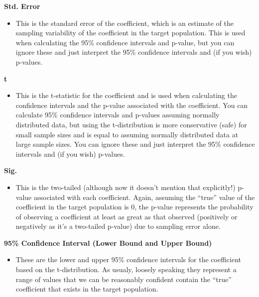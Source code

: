 \documentclass[
]{book}
\providecommand{\tightlist}{%
  \setlength{\itemsep}{0pt}\setlength{\parskip}{0pt}}
\begin{document}
\textbf{Std. Error}

\begin{itemize}
\tightlist
\item
  This is the standard error of the coefficient, which is an estimate of the sampling variability of the coefficient in the target population. This is used when calculating the 95\% confidence intervals and p-value, but you can ignore these and just interpret the 95\% confidence intervals and (if you wish) p-values.
\end{itemize}

\textbf{t}

\begin{itemize}
\tightlist
\item
  This is the t-statistic for the coefficient and is used when calculating the confidence intervals and the p-value associated with the coefficient. You can calculate 95\% confidence intervals and p-values assuming normally distributed data, but using the t-distribution is more conservative (safe) for small sample sizes and is equal to assuming normally distributed data at large sample sizes. You can ignore these and just interpret the 95\% confidence intervals and (if you wish) p-values.
\end{itemize}

\textbf{Sig.}

\begin{itemize}
\tightlist
\item
  This is the two-tailed (although now it doesn't mention that explicitly!) p-value associated with each coefficient. Again, assuming the ``true'' value of the coefficient in the target population is 0, the p-value represents the probability of observing a coefficient at least as great as that observed (positively or negatively as it's a two-tailed p-value) due to sampling error alone.
\end{itemize}

\textbf{95\% Confidence Interval (Lower Bound and Upper Bound)}

\begin{itemize}
\tightlist
\item
  These are the lower and upper 95\% confidence intervals for the coefficient based on the t-distribution. As usualy, loosely speaking they represent a range of values that we can be reasonably confident contain the ``true'' coefficient that exists in the target population.
\end{itemize}
\end{document}
